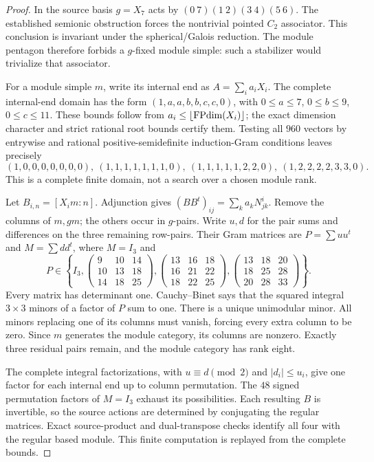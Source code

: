 \begin{proof}
In the source basis $g=X_7$ acts by
$(0\ 7)(1\ 2)(3\ 4)(5\ 6)$. The established semionic obstruction
forces the nontrivial pointed $C_2$ associator. This conclusion is
invariant under the spherical/Galois reduction. The module pentagon
therefore forbids a $g$-fixed module simple: such a stabilizer would
trivialize that associator.

For a module simple $m$, write its internal end as $A=\sum_i a_iX_i$.
The complete internal-end domain has the form
$(1,a,a,b,b,c,c,0)$, with $0\le a\le7$, $0\le b\le9$, $0\le c\le11$.
These bounds follow from $a_i\le\lfloor\operatorname{FPdim}(X_i)\rfloor$;
the exact dimension character and strict rational root bounds certify
them. Testing all $960$ vectors by entrywise and rational
positive-semidefinite induction-Gram conditions leaves precisely
\[
 (1,0,0,0,0,0,0,0),\ (1,1,1,1,1,1,1,0),\
 (1,1,1,1,1,2,2,0),\ (1,2,2,2,2,3,3,0).
\]
This is a complete finite domain, not a search over a chosen module rank.

Let $B_{i,n}=[X_i m:n]$. Adjunction gives
$(BB^t)_{ij}=\sum_k a_kN_{jk}^{i}$. Remove the columns of $m,gm$;
the others occur in $g$-pairs. Write $u,d$ for the pair sums and
differences on the three remaining row-pairs. Their Gram matrices are
$P=\sum uu^t$ and $M=\sum dd^t$, where $M=I_3$ and
\[
P\in\left\{I_3,
\begin{pmatrix}9&10&14\\10&13&18\\14&18&25\end{pmatrix},
\begin{pmatrix}13&16&18\\16&21&22\\18&22&25\end{pmatrix},
\begin{pmatrix}13&18&20\\18&25&28\\20&28&33\end{pmatrix}\right\}.
\]
Every matrix has determinant one. Cauchy--Binet says that the squared
integral $3\times3$ minors of a factor of $P$ sum to one. There is a
unique unimodular minor. All minors replacing one of its columns must
vanish, forcing every extra column to be zero. Since $m$ generates the
module category, its columns are nonzero. Exactly three residual pairs
remain, and the module category has rank eight.

The complete integral factorizations, with $u\equiv d\pmod2$ and
$|d_i|\le u_i$, give one factor for each internal end up to column
permutation. The $48$ signed permutation factors of $M=I_3$ exhaust its
possibilities. Each resulting $B$ is invertible, so the source actions
are determined by conjugating the regular matrices. Exact source-product
and dual-transpose checks identify all four with the regular based
module. This finite computation is replayed from the complete bounds.


\end{proof}
